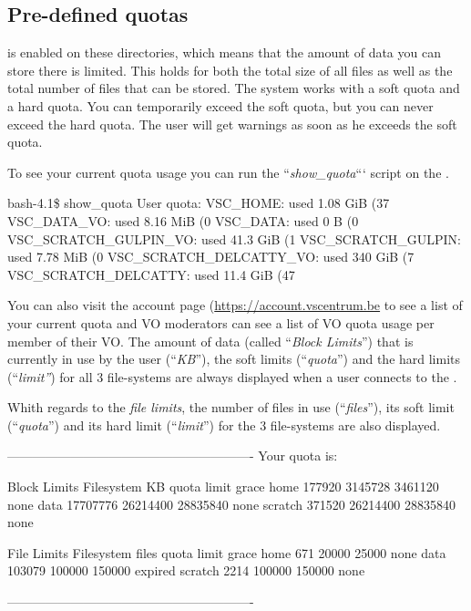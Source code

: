 \subsection{Pre-defined quotas}
\label{subsec:predfined-quotas}

 is enabled on these directories, which means that the amount of
data you can store there is limited. This holds for both the total size of all
files as well as the total number of files that can be stored. The system works
with a soft quota and a hard quota. You can temporarily exceed the soft quota,
but you can never exceed the hard quota. The user will get warnings as soon as
he exceeds the soft quota.


\ifgent
To see your current quota usage you can run the ``\emph{show\_quota}``` script
on the \hpcInfra.

\begin{prompt}
bash-4.1\$ show_quota
User quota:
VSC_HOME: used 1.08 GiB (37%
VSC_DATA_VO: used 8.16 MiB (0%
VSC_DATA: used 0 B (0%
VSC_SCRATCH_GULPIN_VO: used 41.3 GiB (1%
VSC_SCRATCH_GULPIN: used 7.78 MiB (0%
VSC_SCRATCH_DELCATTY_VO: used 340 GiB (7%
VSC_SCRATCH_DELCATTY: used 11.4 GiB (47%
\end{prompt}

You can also visit the account page (\url{https://account.vscentrum.be}
to see a list of your current quota and
VO moderators can see a list of VO quota usage per member of their VO.
\else
The amount of data (called ``\emph{Block Limits}'') that is currently in use
by the user (``\emph{KB}''), the soft limits (``\emph{quota}'') and the
hard limits (``\emph{limit''}) for all 3 file-systems are always displayed
when a user connects to the \hpc.

 Whith regards to the \emph{file limits}, the number of files in use
 (``\emph{files}''), its soft limit (``\emph{quota}'') and its hard limit
 (``\emph{limit}'') for the 3 file-systems are also displayed.

\begin{prompt}
----------------------------------------------------------
Your quota is:

                   Block Limits
   Filesystem         KB      quota      limit    grace
   home           177920    3145728    3461120     none
   data         17707776   26214400   28835840     none
   scratch        371520   26214400   28835840     none

                File Limits
   Filesystem      files      quota      limit    grace
   home              671      20000      25000     none
   data           103079     100000     150000  expired
   scratch          2214     100000     150000     none

----------------------------------------------------------
\end{prompt}

